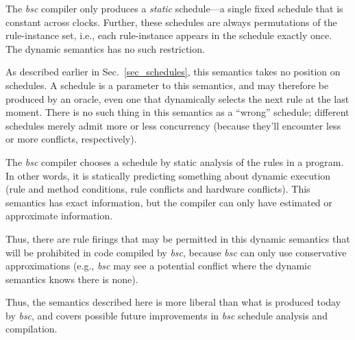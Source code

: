 \documentclass[11pt]{article}
\newcommand{\hdivider}{\noindent\mbox{}\hrulefill\mbox{}}
\begin{document}
The \emph{bsc} compiler only produces a \emph{static} schedule---a
single fixed schedule that is constant across clocks.  Further, these
schedules are always permutations of the rule-instance set, i.e., each
rule-instance appears in the schedule exactly once.  The dynamic
semantics has no such restriction.

As described earlier in Sec.~\ref{sec_schedules}, this semantics takes
no position on schedules.  A schedule is a parameter to this
semantics, and may therefore be produced by an oracle, even one that
dynamically selects the next rule at the last moment.  There is no
such thing in this semantics as a ``wrong'' schedule; different
schedules merely admit more or less concurrency (because they'll
encounter less or more conflicts, respectively).

The \emph{bsc} compiler chooses a schedule by static analysis of the
rules in a program.  In other words, it is statically predicting
something about dynamic execution (rule and method conditions, rule
conflicts and hardware conflicts).  This semantics has exact
information, but the compiler can only have estimated or approximate
information.

Thus, there are rule firings that may be permitted in this dynamic
semantics that will be prohibited in code compiled by \emph{bsc},
because \emph{bsc} can only use conservative approximations (e.g.,
\emph{bsc} may see a potential conflict where the dynamic semantics
knows there is none).

Thus, the semantics described here is more liberal than what is
produced today by \emph{bsc}, and covers possible future improvements
in \emph{bsc} schedule analysis and compilation.


\vspace{1cm}

\hdivider



\end{document}
